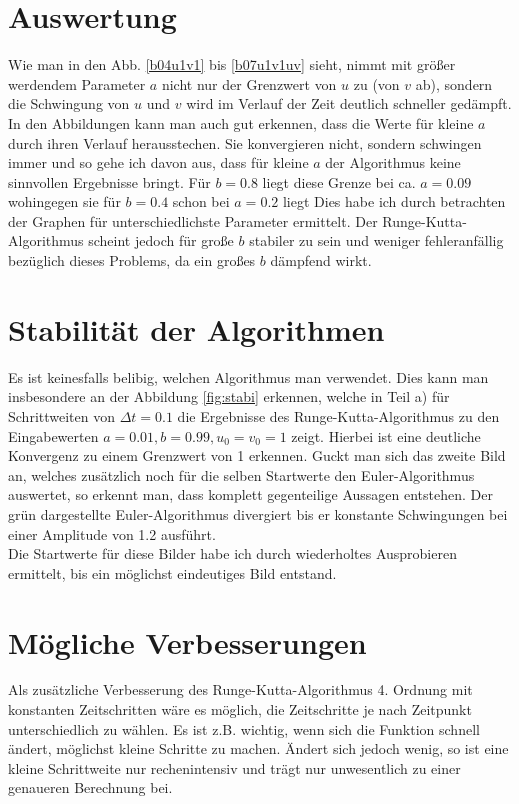 \documentclass[12pt,a4paper,titlepage,headinclude,bibtotoc]{scrartcl}
\begin{document}
\section{Auswertung}
\label{sec:auswertung}
Wie man in den Abb. \ref{b04u1v1} bis \ref{b07u1v1uv} sieht, nimmt mit größer werdendem Parameter $a$ nicht nur der Grenzwert von $u$ zu (von $v$ ab), sondern die Schwingung von $u$ und $v$ wird im Verlauf der Zeit deutlich schneller gedämpft.
In den Abbildungen kann man auch gut erkennen, dass die Werte für kleine $a$ durch ihren Verlauf herausstechen.
Sie konvergieren nicht, sondern schwingen immer und so gehe ich davon aus, dass für kleine $a$ der Algorithmus keine sinnvollen Ergebnisse bringt.
Für $b=0.8$ liegt diese Grenze bei ca. $a=0.09$ wohingegen sie für $b=0.4$ schon bei $a=0.2$ liegt
Dies habe ich durch betrachten der Graphen für unterschiedlichste Parameter ermittelt.
Der Runge-Kutta-Algorithmus scheint jedoch für große $b$ stabiler zu sein und weniger fehleranfällig bezüglich dieses Problems, da ein großes $b$ dämpfend wirkt.


\section{Stabilität der Algorithmen}
Es ist keinesfalls belibig, welchen Algorithmus man verwendet.
Dies kann man insbesondere an der Abbildung \ref{fig:stabi} erkennen, welche in Teil a) für Schrittweiten von $\Delta t=0.1$ die Ergebnisse des Runge-Kutta-Algorithmus zu den Eingabewerten $a=0.01, b=0.99, u_0=v_0=1$ zeigt.
Hierbei ist eine  deutliche Konvergenz zu einem  Grenzwert von 1 erkennen.
Guckt man sich das zweite Bild an, welches zusätzlich noch für die selben Startwerte den Euler-Algorithmus auswertet, so erkennt man, dass komplett gegenteilige Aussagen entstehen.
Der grün dargestellte Euler-Algorithmus divergiert bis er konstante Schwingungen bei einer Amplitude von 1.2 ausführt.\\
Die Startwerte für diese Bilder habe ich durch wiederholtes Ausprobieren ermittelt, bis ein möglichst eindeutiges Bild entstand.



\section{Mögliche Verbesserungen}
Als zusätzliche Verbesserung des Runge-Kutta-Algorithmus 4. Ordnung mit konstanten Zeitschritten wäre es möglich, die Zeitschritte je nach Zeitpunkt unterschiedlich zu wählen.
Es ist z.B. wichtig, wenn sich die Funktion schnell ändert, möglichst kleine Schritte zu machen.
Ändert sich jedoch wenig, so ist eine kleine Schrittweite nur rechenintensiv und trägt nur unwesentlich zu einer genaueren Berechnung bei.
\end{document}
